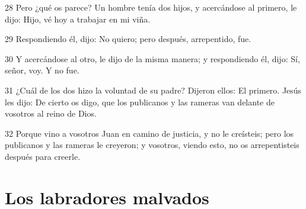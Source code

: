 \par 28 Pero ¿qué os parece? Un hombre tenía dos hijos, y acercándose al primero, le dijo: Hijo, vé hoy a trabajar en mi viña.
\par 29 Respondiendo él, dijo: No quiero; pero después, arrepentido, fue.
\par 30 Y acercándose al otro, le dijo de la misma manera; y respondiendo él, dijo: Sí, señor, voy. Y no fue.
\par 31 ¿Cuál de los dos hizo la voluntad de su padre? Dijeron ellos: El primero. Jesús les dijo: De cierto os digo, que los publicanos y las rameras van delante de vosotros al reino de Dios.
\par 32 Porque vino a vosotros Juan en camino de justicia, y no le creísteis; pero los publicanos y las rameras le creyeron; y vosotros, viendo esto, no os arrepentisteis después para creerle.

\section*{Los labradores malvados}


